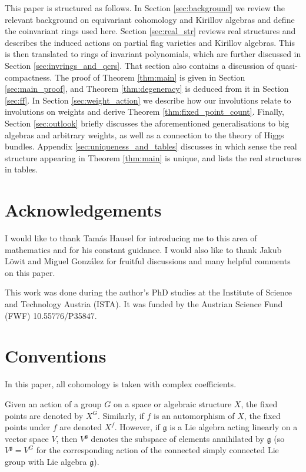 \documentclass{amsart}
\newcommand{\g}{\mathfrak{g}}
\theoremstyle{definition}
\theoremstyle{plain}
\theoremstyle{remark}
\DeclareRobustCommand{\SkipTocEntry}[5]{}
\begin{document}
This paper is structured as follows. In Section \ref{sec:background} we review the relevant background on equivariant cohomology and Kirillov algebras and define the coinvariant rings used here. Section \ref{sec:real_str} reviews real structures and describes the induced actions on partial flag varieties and Kirillov algebras. This is then translated to rings of invariant polynomials, which are further discussed in Section \ref{sec:invrings_and_qcrs}. That section also contains a discussion of quasi-compactness. The proof of Theorem \ref{thm:main} is given in Section \ref{sec:main_proof}, and Theorem \ref{thm:degeneracy} is deduced from it in Section \ref{sec:ff}. In Section \ref{sec:weight_action} we describe how our involutions relate to involutions on weights and derive Theorem \ref{thm:fixed_point_count}. Finally, Section \ref{sec:outlook} briefly discusses the aforementioned generalisations to big algebras and arbitrary weights, as well as a connection to the theory of Higgs bundles. Appendix \ref{sec:uniqueness_and_tables} discusses in which sense the real structure appearing in Theorem \ref{thm:main} is unique, and lists the real structures in tables.

\section*{Acknowledgements}
I would like to thank Tamás Hausel for introducing me to this area of mathematics and for his constant guidance. I would also like to thank Jakub Löwit and Miguel González for fruitful discussions and many helpful comments on this paper. 

This work was done during the author's PhD studies at the Institute of Science and Technology Austria (ISTA). It was funded by the Austrian Science Fund (FWF) 10.55776/P35847.

\section*{Conventions}
In this paper, all cohomology is taken with complex coefficients. 

Given an action of a group $G$ on a space or algebraic structure $X$, the fixed points are denoted by $X^G$. Similarly, if $f$ is an automorphism of $X$, the fixed points under $f$ are denoted $X^f$. However, if $\g$ is a Lie algebra acting linearly on a vector space $V$, then $V^\g$ denotes the subspace of elements annihilated by $\g$ (so $V^\g =V^G$ for the corresponding action of the connected simply connected Lie group with Lie algebra $\g$). 
\end{document}
